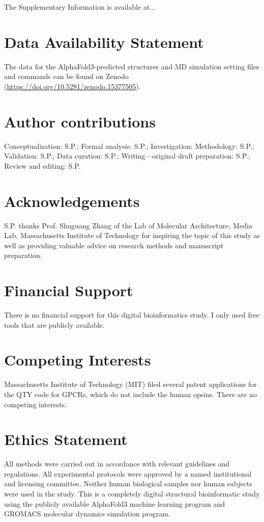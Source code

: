 \documentclass[fleqn, 10pt]{manuscript}
\begin{document}
The Supplementary Information is available at...

\section*{Data Availability Statement} 

The data for the AlphaFold3-predicted structures and MD simulation setting files and commands can be found on Zenodo (\url{https://doi.org/10.5281/zenodo.15377505}). 

\section*{Author contributions}

Conceptualization: S.P.; Formal analysis: S.P.; Investigation: Methodology: S.P.; Validation: S.P.; Data curation: S.P.; Writing—original draft preparation: S.P.; Review and editing: S.P. 

\section*{Acknowledgements}

S.P. thanks Prof. Shuguang Zhang of the Lab of Molecular Architecture, Media Lab, Massachusetts Institute of Technology for inspiring the topic of this study as well as providing valuable advice on research methods and manuscript preparation. 

\section*{Financial Support}

There is no financial support for this digital bioinformatics study. I only used free tools that are publicly available. 

\section*{Competing Interests}

Massachusetts Institute of Technology (MIT) filed several patent applications for the QTY code for GPCRs, which do not include the human opsins. There are no competing interests.


\section*{Ethics Statement}

All methods were carried out in accordance with relevant guidelines and regulations. All experimental protocols were approved by a named institutional and licensing committee. Neither human biological samples nor human subjects were used in the study. This is a completely digital structural bioinformatic study using the publicly available AlphaFold3 machine learning program and GROMACS molecular dynamics simulation program.
\end{document}
